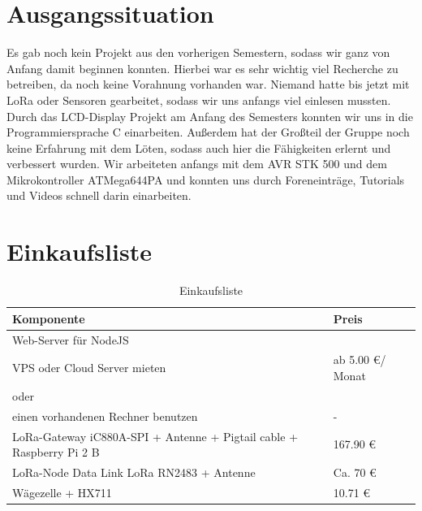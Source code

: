 \chapter{Ausgangssituation}
Es gab noch kein Projekt aus den vorherigen Semestern, sodass wir ganz von Anfang damit beginnen konnten. Hierbei war es sehr wichtig viel Recherche zu betreiben, da noch keine Vorahnung vorhanden war. Niemand hatte bis jetzt mit LoRa oder Sensoren gearbeitet, sodass wir uns anfangs viel einlesen mussten. Durch das LCD-Display Projekt am Anfang des Semesters konnten wir uns in die Programmiersprache C einarbeiten. Außerdem hat der Großteil der Gruppe noch keine Erfahrung mit dem Löten, sodass auch hier die Fähigkeiten erlernt und verbessert wurden. Wir arbeiteten anfangs mit dem AVR STK 500 und dem Mikrokontroller ATMega644PA und konnten uns durch Foreneinträge, Tutorials und Videos schnell darin einarbeiten.

\chapter{Einkaufsliste}

\begin{table}[h]
    \caption{Einkaufsliste}
    \centering

    \begin{tabular}{ | l |  l | }
    \hline
    Komponente & Preis \\ \hline
    Web-Server für NodeJS  & \\
    VPS oder Cloud Server mieten & ab 5.00 \euro / Monat \\
    oder & \\
    einen vorhandenen Rechner benutzen & - \\ \hline
    LoRa-Gateway iC880A-SPI + Antenne + Pigtail cable + Raspberry Pi 2 B & 167.90 \euro \\ \hline
    LoRa-Node Data Link LoRa RN2483 + Antenne & Ca. 70 \euro \\ \hline
    Wägezelle + HX711 & 10.71 \euro \\ \hline
    \end{tabular}
\end{table}

